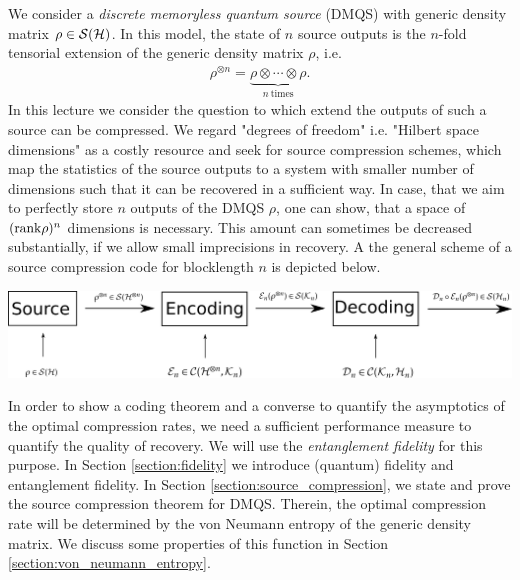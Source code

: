 We consider a \emph{discrete memoryless quantum source} (DMQS) with generic density matrix $\rho \in {\mathcal S}({\mathcal H})$. In this model, the state of $n$ source outputs is the $n$-fold tensorial extension of the generic density matrix $\rho$, i.e.  
\begin{align*}
 \rho^{\otimes n} = \underbrace{\rho \otimes  \cdots \otimes \rho}_{n \ \text{times}}.
\end{align*}
In this lecture we consider the question to which extend the outputs of such a source can be compressed. We regard "degrees of freedom" i.e. "Hilbert space dimensions" as a costly resource and seek for source compression schemes, which map the statistics of the source outputs to a system with smaller number of dimensions such that it can be recovered in a sufficient way. \newline 
In case, that we aim to perfectly store $n$ outputs of the DMQS $\rho$, one can show, that a space of $(\mathrm{rank}\rho)^n$ dimensions is necessary. 
This amount can sometimes be decreased substantially, if we allow small imprecisions in recovery. A the general scheme of a source compression code for blocklength $n$ is depicted below. 
\begin{center}
    \vspace{2ex}
    \includegraphics[scale=.8]{pics/source_compression_scheme}
    \vspace{2ex}
   \end{center}
In order to show a coding theorem and a converse to quantify the asymptotics of the optimal compression rates, we need a sufficient performance measure to quantify the quality of recovery. We will use the \emph{entanglement fidelity} for this purpose. \newline 
In Section \ref{section:fidelity} we introduce (quantum) fidelity and entanglement fidelity. In Section 
\ref{section:source_compression}, we state and prove the source compression theorem for DMQS. Therein, the optimal compression rate will be 
determined by the von Neumann entropy of the generic density matrix. We discuss some properties of this function in Section \ref{section:von_neumann_entropy}.

